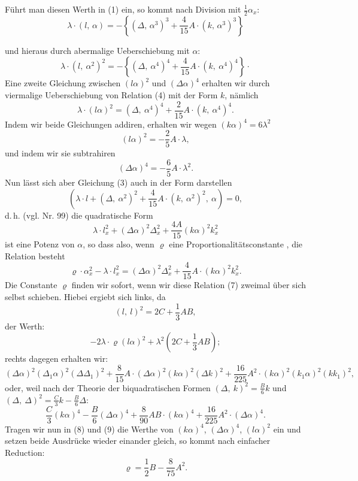 \documentclass[11pt]{article}
\providecommand{\weberpage}[1]{}
\providecommand{\weq}[2]{\begin{equation}\tag{#1}#2\end{equation}}
\let\Delta\varDelta
\begin{document}
Führt man diesen Werth in (1) ein, so kommt nach Division mit $\frac{1}{2}\alpha_x$:
\weq{3}{\lambda\cdot(l,\,\alpha)=-\left\{(\Delta,\,\alpha^3)^3+\frac{4}{15}A\cdot(k,\,\alpha^3)^3\right\}}


\weberpage{293}

und hieraus durch abermalige Ueberschiebung mit $\alpha$:
\weq{4}{\lambda\cdot(l,\ \alpha^2)^2=-\left\{(\varDelta,\ \alpha^4)^4+\frac{4}{15}A\cdot(k,\ \alpha^4)^4\right\}\cdot}
Eine zweite Gleichung zwischen $(l\alpha)^2$ und $(\varDelta\alpha)^4$ erhalten wir durch
viermalige Ueberschiebung von Relation (4) mit der Form $k$, nämlich
\weq{5}{\lambda\cdot(l\alpha)^2=(\varDelta,\ \alpha^4)^4+\frac{2}{15}A\cdot(k,\ \alpha^4)^4.}
Indem wir beide Gleichungen addiren, erhalten wir wegen $(k\alpha)^4=6\lambda^2$
\weq{6}{(l\alpha)^2=-\frac{2}{5}A\cdot\lambda,}
und indem wir sie subtrahiren
\[
(\varDelta\alpha)^4=-\frac{6}{5}A\cdot\lambda^2.
\]
Nun lässt sich aber Gleichung (3) auch in der Form darstellen
\[
\left(\lambda\cdot l+(\varDelta,\ \alpha^2)^2+\frac{4}{15}A\cdot(k,\ \alpha^2)^2,\ \alpha\right)=0,
\]
d.\,h. (vgl. Nr. 99) die quadratische Form
\[
\lambda\cdot l_x^2+(\varDelta\alpha)^2\varDelta_x^2+\frac{4A}{15}(k\alpha)^2k_x^2
\]
ist eine Potenz von $\alpha$, so dass also, wenn $\varrho$ eine Proportionalitätsconstante
, die Relation besteht
\weq{7}{\varrho\cdot\alpha_x^2-\lambda\cdot l_x^2=(\varDelta\alpha)^2\varDelta_x^2+\frac{4}{15}A\cdot(k\alpha)^2k_x^2.}
Die Constante $\varrho$ finden wir sofort, wenn wir diese Relation (7) zweimal
über sich selbst schieben. Hiebei ergiebt sich links, da
\[
(l,\ l)^2=2C+\frac{1}{3}AB,
\]
der Werth:
\weq{8}{-2\lambda\cdot\varrho(l\alpha)^2+\lambda^2\left(2C+\frac{1}{3}AB\right);}
rechts dagegen erhalten wir:
\[
(\varDelta\alpha)^2(\varDelta_1\alpha)^2(\varDelta\varDelta_1)^2+\frac{8}{15}A\cdot(\varDelta\alpha)^2(k\alpha)^2(\varDelta k)^2+\frac{16}{225}A^2\cdot(k\alpha)^2(k_1\alpha)^2(kk_1)^2,
\]
oder, weil nach der Theorie der biquadratischen Formen $(\varDelta,\ k)^2=\frac{B}{6}k$
und $(\varDelta,\ \varDelta)^2=\frac{C}{3}k-\frac{B}{6}\varDelta$:
\weq{9}{\frac{C}{3}(k\alpha)^4-\frac{B}{6}(\varDelta\alpha)^4+\frac{8}{90}AB\cdot(k\alpha)^4+\frac{16}{225}A^2\cdot(\varDelta\alpha)^4.}
Tragen wir nun in (8) und (9) die Werthe von $(k\alpha)^4$, $(\varDelta\alpha)^4$, $(l\alpha)^2$
ein und setzen beide Ausdrücke wieder einander gleich, so kommt
nach einfacher Reduction:
\weq{10}{\varrho=\frac{1}{2}B-\frac{8}{75}A^2.}


\weberpage{294}
\end{document}
